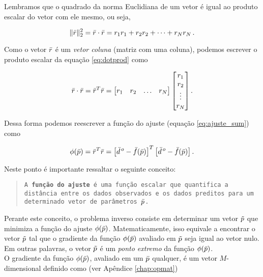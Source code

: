 \indent Lembramos que o quadrado da norma Euclidiana de um vetor é igual ao
produto escalar do vetor com ele mesmo, ou seja,

\begin{equation}
\lVert\bar{r}\rVert_2^2 = \bar{r} \cdot \bar{r} =
    r_1r_1 + r_2r_2 + \dotsb + r_Nr_N \thinspace .
\label{eq:dotprod}
\end{equation}

\noindent Como o vetor $\bar{r}$ é um {\it vetor coluna} (matriz com uma
coluna), podemos escrever o produto escalar da equação \ref{eq:dotprod} como

\begin{equation}
\bar{r} \cdot \bar{r} = \bar{r}^T \bar{r} =
    \begin{bmatrix}
        r_1 & r_2 & \ldots & r_N
    \end{bmatrix}
    \begin{bmatrix}
        r_1 \\ r_2 \\ \vdots \\ r_N
    \end{bmatrix} .
\label{eq:vectdotprod}
\end{equation}

\noindent Dessa forma podemos reescrever a função do ajuste (equação
\ref{eq:ajuste_sum}) como

\begin{equation}
\phi(\bar{p}) = \bar{r}^T \bar{r} =
    \left[\bar{d}^{\thinspace o} - \bar{f}(\bar{p})\right]^T
    \left[\bar{d}^{\thinspace o} - \bar{f}(\bar{p})\right] .
\label{eq:ajuste}
\end{equation}

\indent Neste ponto é importante ressaltar o seguinte conceito:

\begin{quote}
{\tt A {\bf função do ajuste} é uma função escalar que
quantifica a dis\-tân\-cia entre os dados observados e os dados preditos para um
de\-ter\-mi\-na\-do vetor de parâmetros $\bar{p}$.}
\end{quote}

\indent Perante este conceito, o problema inverso consiste em determinar um
vetor $\tilde{p}$ que minimiza a função do ajuste $\phi(\bar{p})$. 
Matematicamente, isso equivale a encontrar o vetor $\tilde{p}$ tal que o gradiente
da função $\phi(\bar{p})$ avaliado em $\tilde{p}$ seja igual ao vetor nulo.
Em outras palavras, o vetor $\tilde{p}$ é um {\it ponto extremo} da função
$\phi(\bar{p})$.
\\
\indent O gradiente da função $\phi(\bar{p})$, avaliado em um $\bar{p}$ qualquer,
é um vetor $M$-dimensional definido como (ver Apêndice \ref{chap:opmat})

